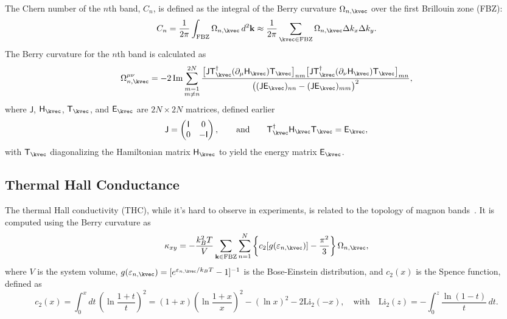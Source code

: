 The Chern number of the $n$th band, $C_n$, is defined as the integral of the Berry curvature $\Omega_{n, \kvec}$ over the first Brillouin zone (FBZ):
\begin{equation}
    C_n = \frac{1}{2\pi} \int_{\text{FBZ}} \Omega_{n, \kvec} \, d^2\mathbf{k} 
    \approx \frac{1}{2\pi} \sum_{\kvec \in \text{FBZ}} \Omega_{n, \kvec} \Delta k_x \Delta k_y.
\end{equation}
The Berry curvature for the $n$th band is calculated as
\begin{equation}
    \Omega_{n, \kvec}^{\mu\nu} = 
    - 2 \, \mathrm{Im} \sum_{\substack{m = 1 \\ m \neq n}}^{2N}
    \frac{
        \big[ \mathsf{J} \mathsf{T}^{\dagger}_{\kvec} (\partial_{\mu} \mathsf{H}_{\kvec}) \mathsf{T}_{\kvec} \big]_{nm}
        \big[ \mathsf{J} \mathsf{T}^{\dagger}_{\kvec} (\partial_{\nu} \mathsf{H}_{\kvec}) \mathsf{T}_{\kvec} \big]_{mn}
    }{\big( (\mathsf{J} \mathsf{E}_{\kvec})_{nn} - (\mathsf{J} \mathsf{E}_{\kvec})_{mm} \big)^2},
\end{equation}
where $\mathsf{J}$, $\mathsf{H}_{\kvec}$, $\mathsf{T}_{\kvec}$, and $\mathsf{E}_{\kvec}$ are $2N \times 2N$ matrices, defined earlier
\begin{equation}
    \mathsf{J} = 
    \begin{pmatrix}
        \mathsf{I} & 0 \\ 0 & -\mathsf{I}
    \end{pmatrix}, 
    \qquad \text{and} \qquad
    \mathsf{T}^{\dagger}_{\kvec} \mathsf{H}_{\kvec} \mathsf{T}_{\kvec} = \mathsf{E}_{\kvec},
\end{equation}
with $\mathsf{T}_{\kvec}$ diagonalizing the Hamiltonian matrix $\mathsf{H}_{\kvec}$ to yield the energy matrix $\mathsf{E}_{\kvec}$.




\subsection{Thermal Hall Conductance}\label{subsec: Thermal Hall Conductance}

The thermal Hall conductivity (THC), while it's hard to observe in experiments, is related to the topology of magnon bands~\cite{PhysRevLett.128.117201}. It is computed using the Berry curvature as
\begin{equation}
    \kappa_{xy} = - \frac{k_B^2 T}{V} \sum_{\mathbf{k} \in \mathrm{FBZ}} \sum_{n=1}^{N} \left\{ c_2[g(\varepsilon_{n, \kvec})] - \frac{\pi^2}{3} \right\} \Omega_{n, \kvec},
\end{equation}
where $V$ is the system volume, $g(\varepsilon_{n, \kvec}) = [e^{\varepsilon_{n, \kvec}/k_B T} - 1]^{-1}$ is the Bose-Einstein distribution, and $c_2(x)$ is the Spence function, defined as
\begin{equation}
    c_2(x) 
    = \int_{0}^{x} dt \, \left( \ln \frac{1 + t}{t} \right)^2 
    = (1 + x) \left( \ln \frac{1 + x}{x} \right)^2 - (\ln x)^2 - 2 \mathrm{Li}_2(-x), 
    \quad \text{with} \quad 
    \mathrm{Li}_2(z) = - \int_{0}^{z} \frac{\ln (1 - t)}{t} \, dt.
\end{equation}



\newpage


